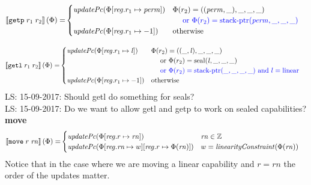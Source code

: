 \documentclass[a3paper]{article}
\newcommand\lau[1]{{\color{purple} \sf \footnotesize {LS: #1}}\\}
\newcommand{\sem}[1]{\left\llbracket #1 \right\rrbracket}
\newcommand{\tand}{\text{ and }}
\newcommand{\tor}{\text{ or }}
\newcommand{\totherwise}{\text{otherwise }}
\newcommand{\sourcecolor}{\color{blue}}
\newcommand{\src}[1]{{\sourcecolor #1}}
\newcommand{\targetcolor}[1]{\color{black}}
\newcommand{\trg}[1]{{\targetcolor{} #1}}
\newcommand{\zinstr}[1]{\texttt{#1}}
\newcommand{\twoinstr}[3]{
  \ifthenelse{\equal{#2#3}{}}
  {\zinstr{#1}}
  {\zinstr{#1} \; #2 \; #3}
}
\newcommand{\tgetp}[2]{\twoinstr{\trg{getp}}{#1}{#2}}
\newcommand{\tgetlin}[2]{\twoinstr{\trg{getl}}{#1}{#2}}
\newcommand{\tmove}[2]{\twoinstr{\trg{move}}{#1}{#2}}
\newcommand{\ints}{\mathbb{Z}}
\newcommand{\update}[2]{[#1 \mapsto #2]}
\newcommand{\updReg}[2]{\update{\reg.#1}{#2}}
\newcommand{\shareddom}[1]{\mathrm{#1}}
\newcommand{\perm}{\var{perm}}
\newcommand{\lin}{\var{l}}
\newcommand{\stkptr}[1]{\mathrm{stack\text{-}ptr}(#1)}
\newcommand{\seal}[1]{\shareddom{seal}(#1)}
\newcommand{\var}[1]{\mathit{#1}}
\newcommand{\rn}{\var{rn}}
\newcommand{\reg}{\var{reg}}
\newcommand{\plainlinearity}[1]{\mathrm{#1}}
\newcommand{\linear}{\plainlinearity{linear}}
\newcommand{\plainfun}[2]{
  \ifthenelse{\equal{#2}{}}
  {\mathit{#1}}
  {\mathit{#1}(#2)}
}
\newcommand{\linCons}[1]{\plainfun{linearityConstraint}{#1}}
\newcommand{\updPcAddr}[1]{\plainfun{updatePc}{#1}}
\begin{document}
\begin{align*}
  \sem{\tgetp{r_1}{r_2}}(\Phi) = & 
                                   \begin{cases}
                                     \updPcAddr{\Phi\updReg{r_1}{\perm}} & 
                                     \arraycolsep=0pt
                                     \begin{array}[t]{l}
                                       \Phi(r_2) = ((\perm,\_),\_,\_,\_) \\
                                       \quad \src{\tor \Phi(r_2) = \stkptr{\perm,\_,\_,\_} } \\
                                     \end{array} \\
                                     \updPcAddr{\Phi\updReg{r_1}{-1}} & \totherwise
                                   \end{cases}
\end{align*}

\begin{align*}
  \sem{\tgetlin{r_1}{r_2}}(\Phi) = & 
                                   \begin{cases}
                                     \updPcAddr{\Phi\updReg{r_1}{\lin}} & 
                                     \arraycolsep=0pt
                                     \begin{array}[t]{l}
                                       \Phi(r_2) = ((\_,\lin),\_,\_,\_) \\
                                       \quad \tor \Phi(r_2) = \seal{\lin,\_,\_,\_} \\
                                       \quad \src{\tor \Phi(r_2) = \stkptr{\_,\_,\_,\_} \tand l = \linear}\\
                                     \end{array} \\
                                     \updPcAddr{\Phi\updReg{r_1}{-1}} & \totherwise
                                   \end{cases}
\end{align*}
\lau{15-09-2017: Should getl do something for seals?}
\lau{15-09-2017: Do we want to allow getl and getp to work on sealed capabilities?}

\noindent\textbf{move}\\
\begin{align*}
  \sem{\tmove{r}{\rn}}(\Phi) = & 
                              \begin{cases}
                                \updPcAddr{\Phi\updReg{r}{\rn}} & \rn \in \ints \\
                                \updPcAddr{\Phi\updReg{\rn}{w}\updReg{r}{\Phi(\rn)}} & w = \linCons{\Phi(\rn)}
                              \end{cases}
\end{align*}
Notice that in the case where we are moving a linear capability and $r = \rn$ the order of the updates matter.
\end{document}
